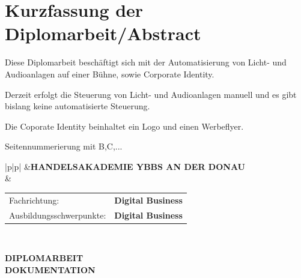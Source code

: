 \chapter*{Kurzfassung der Diplomarbeit/Abstract} 

Diese Diplomarbeit beschäftigt sich mit der Automatisierung von Licht- und Audioanlagen auf einer Bühne, sowie Corporate Identity.

Derzeit erfolgt die Steuerung von Licht- und Audioanlagen manuell und es gibt bislang keine automatisierte Steuerung. 

Die Coporate Identity beinhaltet ein Logo und einen Werbeflyer. 

Seitennummerierung mit B,C,...

\clearpage

\newlength{\haklogobreite}
\newlength{\beschriftungsbreite}
\newlength{\feldA}
\newlength{\feldB}

\begin{tabular}{|p{\haklogobreite}|p{\beschriftungsbreite}|}
\hline
{}&{\vspace{0.05em}\textbf{HANDELSAKADEMIE YBBS AN DER DONAU}}\\[1.05em]
 & { \begin{tabular}{p{\feldA} p{\feldB}}
    Fachrichtung:&\textbf{Digital Business}\\
    Ausbildungsschwerpunkte:&\textbf{Digital Business}\\
   \end{tabular}
   }\\
\hline
\end{tabular}

\begin{center}
 \LARGE \textbf{DIPLOMARBEIT}\\
 \Large \textbf{DOKUMENTATION}\\
 \normalsize
\end{center}

